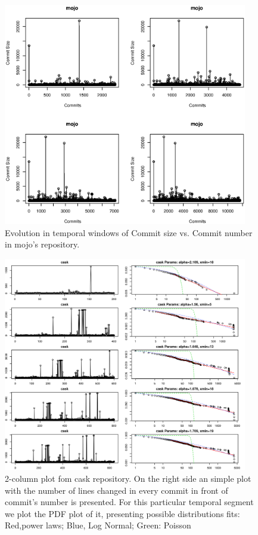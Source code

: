 \documentclass[conference]{IEEEtran}
\begin{document}
\begin{figure}[htbp]
	\centerline{\includegraphics[width=0.95\textwidth]{img/mojo_temporal.eps}}
	\caption{Evolution in temporal windows of Commit size vs. Commit number in mojo's repository.}
	\label{fig:cask}
      \end{figure}

\begin{figure}[htbp]
	\centerline{\includegraphics[width=0.95\textwidth]{img/adjusted_dist_cask.svg}}
	\caption{2-column plot fom cask repository. On the right side an simple plot with the number of lines changed in every commit in front of commit's number is presented. For this particular temporal segment we plot the PDF plot of it, presenting possible distributions fits: Red,power laws; Blue, Log Normal; Green: Poisson}
	\label{fig:cask}
      \end{figure}
\end{document}
